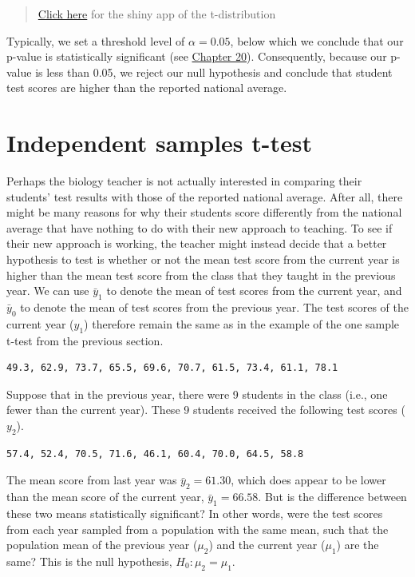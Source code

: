 \documentclass[
]{scrbook}
\begin{document}
\begin{quote}
\href{https://bradduthie.shinyapps.io/t_score/}{Click here} for the shiny app of the t-distribution
\end{quote}

Typically, we set a threshold level of \(\alpha = 0.05\), below which we conclude that our p-value is statistically significant (see \protect\hyperlink{Chapter_20}{Chapter 20}).
Consequently, because our p-value is less than 0.05, we reject our null hypothesis and conclude that student test scores are higher than the reported national average.

\hypertarget{independent-samples-t-test}{%
\section{Independent samples t-test}\label{independent-samples-t-test}}

Perhaps the biology teacher is not actually interested in comparing their students' test results with those of the reported national average.
After all, there might be many reasons for why their students score differently from the national average that have nothing to do with their new approach to teaching.
To see if their new approach is working, the teacher might instead decide that a better hypothesis to test is whether or not the mean test score from the current year is higher than the mean test score from the class that they taught in the previous year.
We can use \(\bar{y}_{1}\) to denote the mean of test scores from the current year, and \(\bar{y}_{0}\) to denote the mean of test scores from the previous year.
The test scores of the current year (\(y_{1}\)) therefore remain the same as in the example of the one sample t-test from the previous section.

\begin{verbatim}
49.3, 62.9, 73.7, 65.5, 69.6, 70.7, 61.5, 73.4, 61.1, 78.1
\end{verbatim}

Suppose that in the previous year, there were 9 students in the class (i.e., one fewer than the current year).
These 9 students received the following test scores (\(y_{2}\)).

\begin{verbatim}
57.4, 52.4, 70.5, 71.6, 46.1, 60.4, 70.0, 64.5, 58.8
\end{verbatim}

The mean score from last year was \(\bar{y}_{2} = 61.30\), which does appear to be lower than the mean score of the current year, \(\bar{y}_{1} = 66.58\).
But is the difference between these two means statistically significant?
In other words, were the test scores from each year sampled from a population with the same mean, such that the population mean of the previous year (\(\mu_{2}\)) and the current year (\(\mu_{1}\)) are the same?
This is the null hypothesis, \(H_{0}: \mu_{2} = \mu_{1}\).
\end{document}
